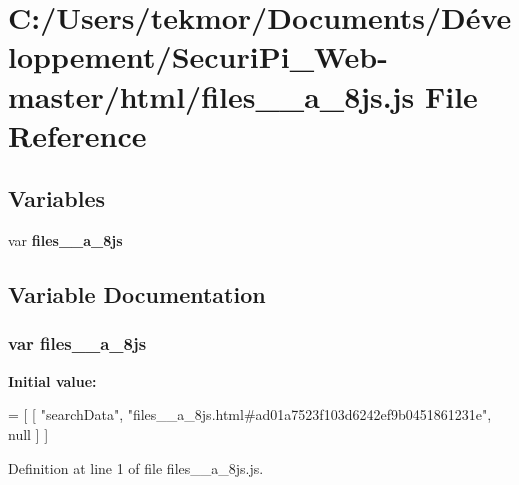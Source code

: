 \section{C\+:/\+Users/tekmor/\+Documents/\+Développement/\+Securi\+Pi\+\_\+\+Web-\/master/html/files\+\_\+\+\_\+a\+\_\+8js.js File Reference}
\label{files____a__8js_8js}
\subsection*{Variables}
\begin{DoxyCompactItemize}
\item 
var {\bf files\+\_\+\+\_\+a\+\_\+8js}
\end{DoxyCompactItemize}


\subsection{Variable Documentation}
\subsubsection[{files\+\_\+\+\_\+a\+\_\+8js}]{\setlength{\rightskip}{0pt plus 5cm}var files\+\_\+\+\_\+a\+\_\+8js}\label{files____a__8js_8js_a4c2038c58a27cdc9aab0084fbff8a4a6}
{\bfseries Initial value\+:}
\begin{DoxyCode}
=
[
    [ \textcolor{stringliteral}{"searchData"}, \textcolor{stringliteral}{"files\_\_a\_8js.html#ad01a7523f103d6242ef9b0451861231e"}, null ]
]
\end{DoxyCode}


Definition at line 1 of file files\+\_\+\+\_\+a\+\_\+8js.\+js.


